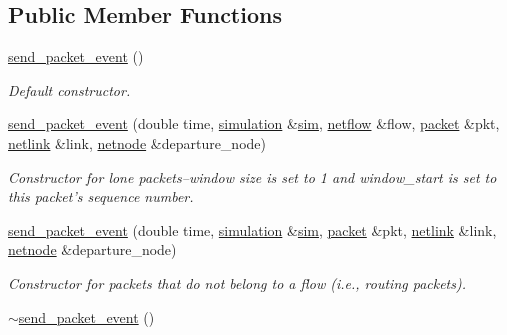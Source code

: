 \subsection*{Public Member Functions}
\begin{DoxyCompactItemize}
\item 
\hyperlink{classsend__packet__event_a23728f781123d70f9499428c2fd61f58}{send\-\_\-packet\-\_\-event} ()
\begin{DoxyCompactList}\small\item\em Default constructor. \end{DoxyCompactList}\item 
\hyperlink{classsend__packet__event_a41388d80736ce35461e727fccf41d827}{send\-\_\-packet\-\_\-event} (double time, \hyperlink{classsimulation}{simulation} \&\hyperlink{classevent_a08c6d828bfb6f5539dcd1491e8ac77d2}{sim}, \hyperlink{classnetflow}{netflow} \&flow, \hyperlink{classpacket}{packet} \&pkt, \hyperlink{classnetlink}{netlink} \&link, \hyperlink{classnetnode}{netnode} \&departure\-\_\-node)
\begin{DoxyCompactList}\small\item\em Constructor for lone packets--window size is set to 1 and window\-\_\-start is set to this packet's sequence number. \end{DoxyCompactList}\item 
\hyperlink{classsend__packet__event_a38ce0bd431eae8069b627b44f55a4f2d}{send\-\_\-packet\-\_\-event} (double time, \hyperlink{classsimulation}{simulation} \&\hyperlink{classevent_a08c6d828bfb6f5539dcd1491e8ac77d2}{sim}, \hyperlink{classpacket}{packet} \&pkt, \hyperlink{classnetlink}{netlink} \&link, \hyperlink{classnetnode}{netnode} \&departure\-\_\-node)
\begin{DoxyCompactList}\small\item\em Constructor for packets that do not belong to a flow (i.\-e., routing packets). \end{DoxyCompactList}\item 
\hypertarget{classsend__packet__event_aab23e16e033bbf20a22ae74bb3709e12}{\hyperlink{classsend__packet__event_aab23e16e033bbf20a22ae74bb3709e12}{$\sim$send\-\_\-packet\-\_\-event} ()}\label{classsend__packet__event_aab23e16e033bbf20a22ae74bb3709e12}


\end{DoxyCompactItemize}
